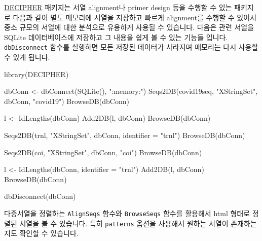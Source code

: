 \documentclass[
]{book}
\newenvironment{Shaded}{\begin{snugshade}}{\end{snugshade}}
\newcommand{\AttributeTok}[1]{\textcolor[rgb]{0.77,0.63,0.00}{#1}}
\newcommand{\FunctionTok}[1]{\textcolor[rgb]{0.00,0.00,0.00}{#1}}
\newcommand{\NormalTok}[1]{#1}
\newcommand{\OtherTok}[1]{\textcolor[rgb]{0.56,0.35,0.01}{#1}}
\newcommand{\StringTok}[1]{\textcolor[rgb]{0.31,0.60,0.02}{#1}}
\begin{document}
\href{https://www.bioconductor.org/packages/release/bioc/html/DECIPHER.html}{DECIPHER} 패키지는 서열 alignment나 primer design 등을 수행할 수 있는 패키지로 다음과 같이 별도 메모리에 서열을 저장하고 빠르게 alignment를 수행할 수 있어서 중소 규모의 서열에 대한 분석으로 유용하게 사용될 수 있습니다. 다음은 관련 서열을 SQLite 데이터베이스에 저장하고 그 내용을 쉽게 볼 수 있는 기능들 입니다. \texttt{dbDisconnect} 함수를 실행하면 모든 저장된 데이터가 사라지며 매모리는 다시 사용할 수 있게 됩니다.

\begin{Shaded}
\begin{Highlighting}[]
\FunctionTok{library}\NormalTok{(DECIPHER)}

\NormalTok{dbConn }\OtherTok{\textless{}{-}} \FunctionTok{dbConnect}\NormalTok{(}\FunctionTok{SQLite}\NormalTok{(), }\StringTok{":memory:"}\NormalTok{)}
\FunctionTok{Seqs2DB}\NormalTok{(covid19seq, }\StringTok{"XStringSet"}\NormalTok{, dbConn, }\StringTok{"covid19"}\NormalTok{)}
\FunctionTok{BrowseDB}\NormalTok{(dbConn)}

\NormalTok{l }\OtherTok{\textless{}{-}} \FunctionTok{IdLengths}\NormalTok{(dbConn)}
\FunctionTok{Add2DB}\NormalTok{(l, dbConn)}
\FunctionTok{BrowseDB}\NormalTok{(dbConn)}

\FunctionTok{Seqs2DB}\NormalTok{(trnl, }\StringTok{"XStringSet"}\NormalTok{, dbConn, }\AttributeTok{identifier =} \StringTok{"trnl"}\NormalTok{)}
\FunctionTok{BrowseDB}\NormalTok{(dbConn)}

\FunctionTok{Seqs2DB}\NormalTok{(coi, }\StringTok{"XStringSet"}\NormalTok{, dbConn, }\StringTok{"coi"}\NormalTok{)}
\FunctionTok{BrowseDB}\NormalTok{(dbConn)}

\NormalTok{l }\OtherTok{\textless{}{-}} \FunctionTok{IdLengths}\NormalTok{(dbConn, }\AttributeTok{identifier =} \StringTok{"trnl"}\NormalTok{)}
\FunctionTok{Add2DB}\NormalTok{(l, dbConn)}
\FunctionTok{BrowseDB}\NormalTok{(dbConn)}

\FunctionTok{dbDisconnect}\NormalTok{(dbConn)}
\end{Highlighting}
\end{Shaded}

다중서열을 정렬하는 \texttt{AlignSeqs} 함수와 \texttt{BrowseSeqs} 함수를 활용해서 html 형태로 정렬된 서열을 볼 수 있습니다. 특히 \texttt{patterns} 옵션을 사용해서 원하는 서열이 존재하는지도 확인할 수 있습니다.
\end{document}
